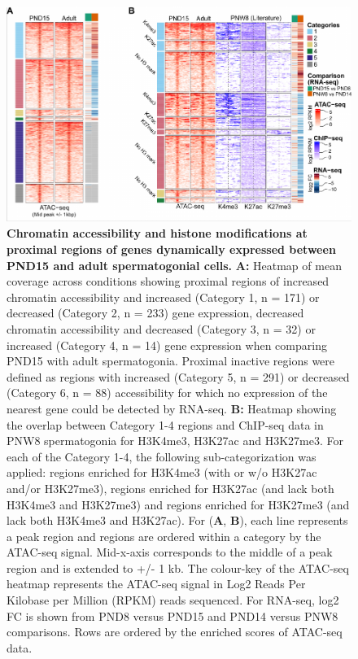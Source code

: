 \documentclass[12pt,twoside]{reedthesis}
\begin{document}
\begin{subfigures}


\begin{figure}[H]

{\centering \includegraphics{thesis_files/figure-latex/df3a-1} 

}

\caption[Chromatin accessibility and histone modifications at proximal regions of genes dynamically expressed between PND15 and adult spermatogonial cells]{\textbf{Chromatin accessibility and histone modifications at proximal regions of genes dynamically expressed between PND15 and adult spermatogonial cells.} \newline \textbf{A:} Heatmap of mean coverage across conditions showing proximal regions of increased chromatin accessibility and increased (Category 1, n = 171) or decreased (Category 2, n = 233) gene expression, decreased chromatin accessibility and decreased (Category 3, n = 32) or increased (Category 4, n = 14) gene expression when comparing PND15 with adult spermatogonia. Proximal inactive regions were defined as regions with increased (Category 5, n = 291) or decreased (Category 6, n = 88) accessibility for which no expression of the nearest gene could be detected by RNA-seq. \newline \textbf{B:} Heatmap showing the overlap between Category 1-4 regions and ChIP-seq data in PNW8 spermatogonia for H3K4me3, H3K27ac and H3K27me3. For each of the Category 1-4, the following sub-categorization was applied: regions enriched for H3K4me3 (with or w/o H3K27ac and/or H3K27me3), regions enriched for H3K27ac (and lack both H3K4me3 and H3K27me3) and regions enriched for H3K27me3 (and lack both H3K4me3 and H3K27ac). For (\textbf{A}, \textbf{B}), each line represents a peak region and regions are ordered within a category by the ATAC-seq signal. Mid-x-axis corresponds to the middle of a peak region and is extended to +/- 1 kb. The colour-key of the ATAC-seq heatmap represents the ATAC-seq signal in Log2 Reads Per Kilobase per Million (RPKM) reads sequenced. For RNA-seq, log2 FC is shown from PND8 versus PND15 and PND14 versus PNW8 comparisons. Rows are ordered by the enriched scores of ATAC-seq data.}\label{fig:df3a}
\end{figure}


\end{subfigures}
\end{document}
